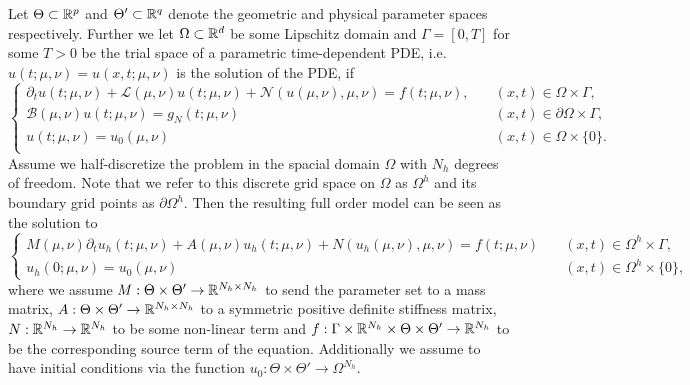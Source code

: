 Let $\Theta \subset \mathbb{R}^{p}$ and $\Theta' \subset \mathbb{R}^q$ denote the geometric and physical parameter spaces respectively. Further we let $\Omega \subset \mathbb{R}^d$ be some Lipschitz domain and $\Gamma = [0, T]$ for some $T > 0$ be the trial space of a parametric time-dependent PDE, i.e. $u(t; \mu, \nu) = u(x, t; \mu, \nu)$ is the solution of the PDE, if
\begin{equation*}\begin{cases}
    \partial_t u(t; \mu, \nu) + \mathcal{L}(\mu, \nu)u(t; \mu, \nu) + \mathcal{N}(u(\mu, \nu), \mu, \nu) = f(t; \mu, \nu), \quad &(x, t) \in \Omega \times \Gamma, \\
    \mathcal{B}(\mu, \nu) u(t; \mu, \nu) = g_N(t; \mu, \nu) &(x, t) \in \partial \Omega \times \Gamma, \\
    u(t; \mu, \nu) = u_0(\mu, \nu) &(x, t) \in \Omega \times \{0 \}. \\
\end{cases}
\end{equation*}
Assume we half-discretize the problem in the spacial domain $\Omega$ with $N_h$ degrees of freedom. Note that we refer to this discrete grid space on $\Omega$ as $\Omega^h$ and its boundary grid points as $\partial \Omega^{h}$. Then the resulting full order model can be seen as the solution to 
\begin{equation*} \begin{cases}
    M(\mu, \nu) \partial_{t} u_h(t; \mu, \nu) + A(\mu, \nu) u_h(t; \mu, \nu) + N(u_h(\mu, \nu), \mu, \nu)= f(t; \mu, \nu)  \quad &(x, t) \in \Omega^{h} \times \Gamma, \\
    u_h(0; \mu, \nu) = u_0(\mu, \nu) \quad &(x, t) \in \Omega^{h} \times \{0\}, \end{cases} 
\end{equation*}
where we assume $M: \Theta \times \Theta' \to \mathbb{R}^{N_h \times N_h}$ to send the parameter set to a mass matrix, $A: \Theta \times \Theta' \to \mathbb{R}^{N_h \times N_h}$ to a symmetric positive definite stiffness matrix, $N: \mathbb{R}^{N_h} \to \mathbb{R}^{N_h}$ to be some non-linear term and $f: \Gamma \times \mathbb{R}^{N_h} \times \Theta \times \Theta' \to \mathbb{R}^{N_h}$ to be the corresponding source term of the equation. Additionally we assume to have initial conditions via the function $u_0: \Theta \times \Theta' \to \Omega^{N_h}$.


